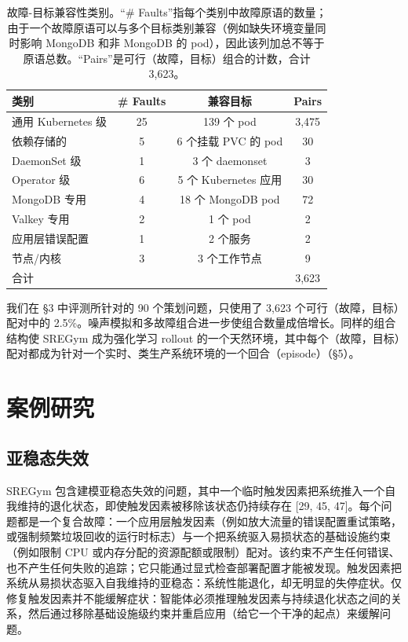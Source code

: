 \documentclass[11pt,UTF8,fontset=fandol]{ctexart}
\begin{document}
\begin{table}[H]\centering
\caption{故障-目标兼容性类别。“\# Faults”指每个类别中故障原语的数量；由于一个故障原语可以与多个目标类别兼容（例如缺失环境变量同时影响 MongoDB 和非 MongoDB 的 pod），因此该列加总不等于原语总数。“Pairs”是可行（故障，目标）组合的计数，合计 3,623。}
\label{tab:7}
\begin{tabular}{lccc}
\toprule
类别 & \# Faults & 兼容目标 & Pairs \\
\midrule
通用 Kubernetes 级 & 25 & 139 个 pod & 3,475 \\
依赖存储的 & 5 & 6 个挂载 PVC 的 pod & 30 \\
DaemonSet 级 & 1 & 3 个 daemonset & 3 \\
Operator 级 & 6 & 5 个 Kubernetes 应用 & 30 \\
MongoDB 专用 & 4 & 18 个 MongoDB pod & 72 \\
Valkey 专用 & 2 & 1 个 pod & 2 \\
应用层错误配置 & 1 & 2 个服务 & 2 \\
节点/内核 & 3 & 3 个工作节点 & 9 \\
\midrule
合计 & & & 3,623 \\
\bottomrule
\end{tabular}
\end{table}

我们在 §3 中评测所针对的 90 个策划问题，只使用了 3,623 个可行（故障，目标）配对中的 2.5\%。噪声模拟和多故障组合进一步使组合数量成倍增长。同样的组合结构使 SREGym 成为强化学习 rollout 的一个天然环境，其中每个（故障，目标）配对都成为针对一个实时、类生产系统环境的一个回合（episode）（§5）。

\section{案例研究}

\subsection{亚稳态失效}

SREGym 包含建模亚稳态失效的问题，其中一个临时触发因素把系统推入一个自我维持的退化状态，即使触发因素被移除该状态仍持续存在 [29, 45, 47]。每个问题都是一个复合故障：一个应用层触发因素（例如放大流量的错误配置重试策略，或强制频繁垃圾回收的运行时标志）与一个把系统驱入易损状态的基础设施约束（例如限制 CPU 或内存分配的资源配额或限制）配对。该约束不产生任何错误、也不产生任何失败的追踪；它只能通过显式检查部署配置才能被发现。触发因素把系统从易损状态驱入自我维持的亚稳态：系统性能退化，却无明显的失停症状。仅修复触发因素并不能缓解症状：智能体必须推理触发因素与持续退化状态之间的关系，然后通过移除基础设施级约束并重启应用（给它一个干净的起点）来缓解问题。
\end{document}

